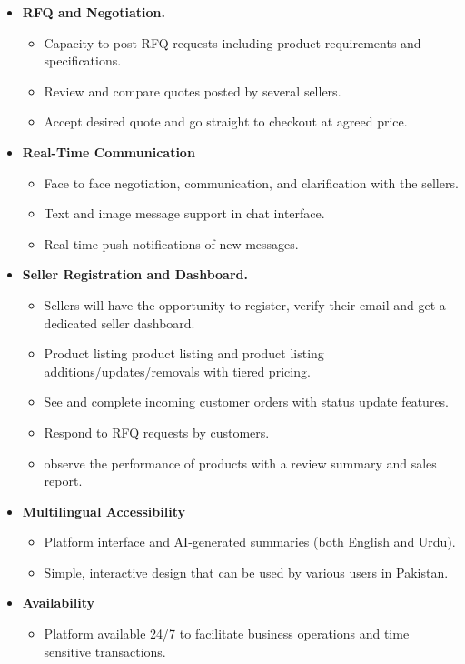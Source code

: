 \begin{itemize}
    \item \textbf{RFQ and Negotiation.}
    \begin{itemize}
        \item Capacity to post RFQ requests including product requirements and specifications.
        \item Review and compare quotes posted by several sellers.
        \item Accept desired quote and go straight to checkout at agreed price.
    \end{itemize}

    \item \textbf{Real-Time Communication}
    \begin{itemize}
        \item Face to face negotiation, communication, and clarification with the sellers.
        \item Text and image message support in chat interface.
        \item Real time push notifications of new messages.
    \end{itemize}

    \item \textbf{Seller Registration and Dashboard.}
    \begin{itemize}
        \item Sellers will have the opportunity to register, verify their email and get a dedicated seller dashboard.
        \item Product listing product listing and product listing additions/updates/removals with tiered pricing.
        \item See and complete incoming customer orders with status update features.
        \item Respond to RFQ requests by customers.
        \item observe the performance of products with a review summary and sales report.
    \end{itemize}

    \item \textbf{Multilingual Accessibility}
    \begin{itemize}
        \item Platform interface and AI-generated summaries (both English and Urdu).
        \item Simple, interactive design that can be used by various users in Pakistan.
    \end{itemize}

    \item \textbf{Availability}
    \begin{itemize}
        \item Platform available 24/7 to facilitate business operations and time sensitive transactions.
    \end{itemize}
\end{itemize}

